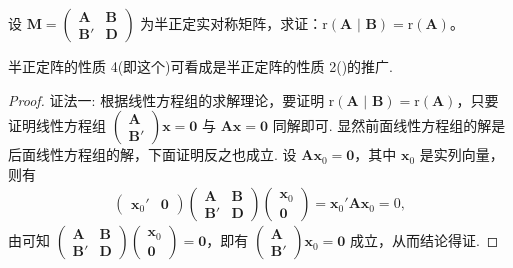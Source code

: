 \documentclass[../../main.tex]{subfiles}
\begin{document}
\begin{proposition}\label{proposition:例8.75}
设 $\boldsymbol{M}=\begin{pmatrix}
\boldsymbol{A} & \boldsymbol{B} \\
\boldsymbol{B}' & \boldsymbol{D}
\end{pmatrix}$ 为半正定实对称矩阵，求证：$\mathrm{r}\left( \boldsymbol{A}\,\,|\,\,\boldsymbol{B} \right) =\mathrm{r}(\boldsymbol{A})$。
\end{proposition}
\begin{remark}
半正定阵的性质 4(即这个)可看成是半正定阵的性质 2()的推广. 
\end{remark}
\begin{proof}
{\color{blue}证法一:}
根据线性方程组的求解理论，要证明 $\mathrm{r}\left( \boldsymbol{A}\,\,|\,\,\boldsymbol{B} \right) =\mathrm{r}(\boldsymbol{A})$，只要证明线性方程组 $\begin{pmatrix}
\boldsymbol{A} \\
\boldsymbol{B}'
\end{pmatrix}\boldsymbol{x}=\boldsymbol{0}$ 与 $\boldsymbol{A}\boldsymbol{x}=\boldsymbol{0}$ 同解即可. 显然前面线性方程组的解是后面线性方程组的解，下面证明反之也成立. 设 $\boldsymbol{A}\boldsymbol{x}_0=\boldsymbol{0}$，其中 $\boldsymbol{x}_0$ 是实列向量，则有
\begin{align*}
\begin{pmatrix}
\boldsymbol{x}_0' & \boldsymbol{0}
\end{pmatrix}
\begin{pmatrix}
\boldsymbol{A} & \boldsymbol{B} \\
\boldsymbol{B}' & \boldsymbol{D}
\end{pmatrix}
\begin{pmatrix}
\boldsymbol{x}_0 \\
\boldsymbol{0}
\end{pmatrix}=\boldsymbol{x}_0'\boldsymbol{A}\boldsymbol{x}_0 = 0,
\end{align*}
由可知 $\begin{pmatrix}
\boldsymbol{A} & \boldsymbol{B} \\
\boldsymbol{B}' & \boldsymbol{D}
\end{pmatrix}
\begin{pmatrix}
\boldsymbol{x}_0 \\
\boldsymbol{0}
\end{pmatrix}=\boldsymbol{0}$，即有 $\begin{pmatrix}
\boldsymbol{A} \\
\boldsymbol{B}'
\end{pmatrix}\boldsymbol{x}_0=\boldsymbol{0}$ 成立，从而结论得证.


\end{proof}
\end{document}
